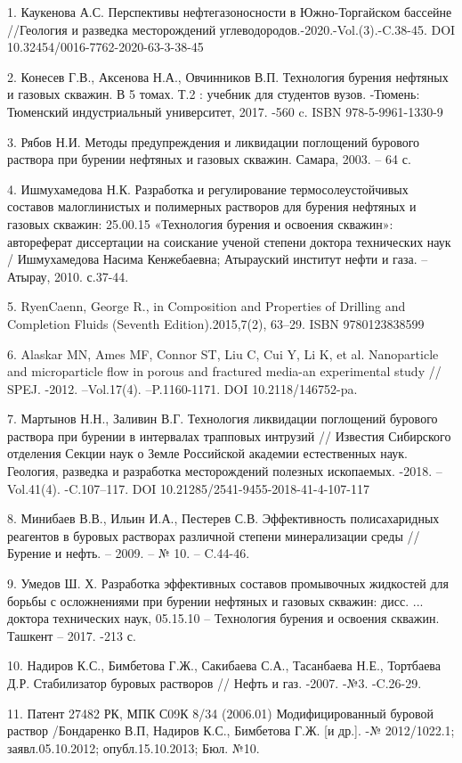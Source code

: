 \begin{references}
1. Каукенова А.С. Перспективы нефтегазоносности в Южно-Торгайском
бассейне //Геология и разведка месторождений
углеводородов.-2020.-Vol.(3).-C.38-45. DOI
10.32454/0016-7762-2020-63-3-38-45

2. Конесев Г.В., Аксенова Н.А., Овчинников В.П. Технология бурения
нефтяных и газовых скважин. В 5 томах. Т.2 : учебник для студентов
вузов. -Тюмень: Тюменский индустриальный университет, 2017. -560 c. ISBN
978-5-9961-1330-9

3. Рябов Н.И. Методы предупреждения и ликвидации поглощений бурового
раствора при бурении нефтяных и газовых скважин. Самара, 2003. -- 64 с.

4. Ишмухамедова Н.К. Разработка и регулирование термосолеустойчивых
составов малоглинистых и полимерных растворов для бурения нефтяных и
газовых скважин: 25.00.15 «Технология бурения и освоения скважин»:
автореферат диссертации на соискание ученой степени доктора технических
наук / Ишмухамедова Насима Кенжебаевна; Атырауский институт нефти и
газа. -- Атырау, 2010. с.37-44.

5. RyenCaenn, George R., in Composition and Properties of Drilling and
Completion Fluids (Seventh Edition).2015,7(2), 63--29. ISBN
9780123838599

6. Alaskar MN, Ames MF, Connor ST, Liu C, Cui Y, Li K, et al.
Nanoparticle and microparticle flow in porous and fractured media-an
experimental study // SPEJ. -2012. --Vol.17(4). --P.1160-1171. DOI
10.2118/146752-pa.

7. Мартынов Н.Н., Заливин В.Г. Технология ликвидации поглощений бурового
раствора при бурении в интервалах трапповых интрузий // Известия
Сибирского отделения Секции наук о Земле Российской академии
естественных наук. Геология, разведка и разработка месторождений
полезных ископаемых. -2018. --Vol.41(4). -C.107--117. DOI
10.21285/2541-9455-2018-41-4-107-117

8. Минибаев В.В., Ильин И.А., Пестерев С.В. Эффективность полисахаридных
реагентов в буровых растворах различной степени минерализации среды //
Бурение и нефть. -- 2009. -- № 10. -- C.44-46.

9. Умедов Ш. Х. Разработка эффективных составов промывочных жидкостей
для борьбы с осложнениями при бурении нефтяных и газовых скважин: дисс.
... доктора технических наук, 05.15.10 -- Технология бурения и освоения
скважин. Ташкент -- 2017. -213 с.

10. Надиров К.С., Бимбетова Г.Ж., Сакибаева С.А., Тасанбаева Н.Е.,
Тортбаева Д.Р. Стабилизатор буровых растворов // Нефть и газ. -2007.
-№3. -C.26-29.

11. Патент 27482 РК, МПК С09К 8/34 (2006.01) Модифицированный буровой
раствор /Бондаренко В.П, Надиров К.С., Бимбетова Г.Ж. {[}и др.{]}. -№
2012/1022.1; заявл.05.10.2012; опубл.15.10.2013; Бюл. №10.
\end{references}

